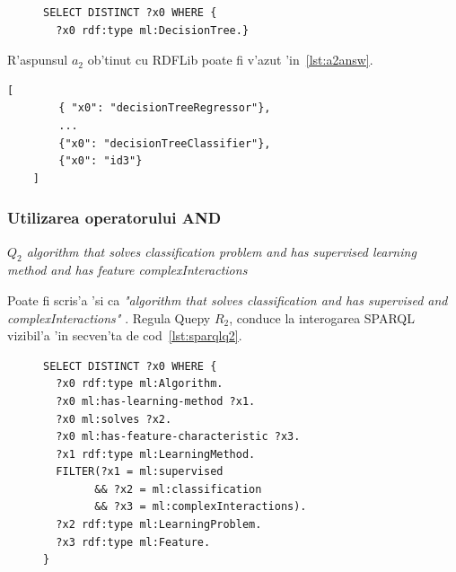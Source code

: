 \documentclass[12pt,a4paper,twoside]{report}
\begin{document}
\begin{figure}[h]
\begin{footnotesize}
\begin{lstlisting}[captionpos=b, caption=Interogare SPARQL pentru ob'tinerea indivizilor clasei $DecisionTree$, label=lst:sparql:dt,
   basicstyle=\ttfamily,frame=single]
SELECT DISTINCT ?x0 WHERE {
  ?x0 rdf:type ml:DecisionTree.}
\end{lstlisting}
\end{footnotesize}
\end{figure}

R'aspunsul $a_2$ ob'tinut cu RDFLib poate fi v'azut 'in~\ref{lst:a2answ}.

\begin{center}
\begin{lstlisting}[basicstyle=\footnotesize,  caption = R'aspunsul $a2$, label=lst:a2answ]
    [
        { "x0": "decisionTreeRegressor"}, 
        ...
        {"x0": "decisionTreeClassifier"}, 
        {"x0": "id3"}
    ]
\end{lstlisting}
\end{center}

\subsubsection{Utilizarea operatorului AND}

{\it $Q_2$ algorithm that solves classification problem and has supervised learning method and has feature complexInteractions}

Poate fi scris'a 'si ca {\it "algorithm that solves classification and has supervised and complexInteractions" }. Regula Quepy $R_2$, conduce la interogarea SPARQL vizibil'a 'in secven'ta de cod~\ref{lst:sparqlq2}.
\begin{figure}[h]
\begin{footnotesize}
\begin{lstlisting}[captionpos=b, caption=Formalizarea SPARQL a interog'arii $Q_2$, label=lst:sparqlq2,  basicstyle=\ttfamily,frame=single]
SELECT DISTINCT ?x0 WHERE {
  ?x0 rdf:type ml:Algorithm.
  ?x0 ml:has-learning-method ?x1.
  ?x0 ml:solves ?x2.
  ?x0 ml:has-feature-characteristic ?x3.
  ?x1 rdf:type ml:LearningMethod.
  FILTER(?x1 = ml:supervised 
        && ?x2 = ml:classification 
        && ?x3 = ml:complexInteractions).
  ?x2 rdf:type ml:LearningProblem.
  ?x3 rdf:type ml:Feature.
}
\end{lstlisting}
\end{footnotesize}
\end{figure}
\end{document}
